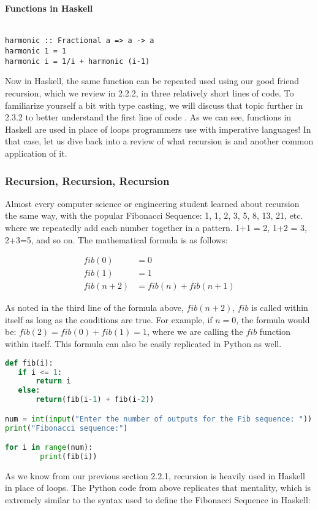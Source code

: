 \documentclass{article}
\begin{document}
\paragraph{Functions in Haskell}
\begin{lstlisting}

harmonic :: Fractional a => a -> a 
harmonic 1 = 1 
harmonic i = 1/i + harmonic (i-1)
\end{lstlisting}

\noindent
Now in Haskell, the same function can be repeated used using our good friend recursion, which we review in 2.2.2, in three relatively short lines of code. To familiarize yourself a bit with type casting, we will discuss that topic further in 2.3.2 to better understand the first line of code \cite{Haskell.org Fractional}. As we can see, functions in Haskell are used in place of loops programmers use with imperative languages! In that case, let us dive back into a review of what recursion is and another common application of it.

\subsubsection{Recursion, Recursion, Recursion}
Almost every computer science or engineering student learned about recursion the same way, with the popular Fibonacci Sequence: 1, 1, 2, 3, 5, 8, 13, 21, etc. where we repeatedly add each number together in a pattern. 1+1 = 2, 1+2 = 3, 2+3=5, and so on. The mathematical formula is as follows:

\begin{align}
fib(0) & = 0\\
fib(1) & = 1\\
fib(n+2) & = fib(n) + fib(n+1)
\end{align}

\noindent
As noted in the third line of the formula above, $fib(n+2)$, $fib$ is called within itself as long as the conditions are true. For example, if $n = 0$, the formula would be: $fib(2) = fib(0) + fib(1) = 1$, where we are calling the $fib$ function within itself.
This formula can also be easily replicated in Python as well.

\begin{lstlisting}[language=Python]
def fib(i):
   if i <= 1:
       return i
   else:
       return(fib(i-1) + fib(i-2))

num = int(input("Enter the number of outputs for the Fib sequence: "))
print("Fibonacci sequence:")

for i in range(num):
        print(fib(i))
\end{lstlisting}
\noindent
As we know from our previous section 2.2.1, recursion is heavily used in Haskell in place of loops. The Python code from above replicates that mentality, which is extremely similar to the syntax used to define the Fibonacci Sequence in Haskell:
\end{document}
